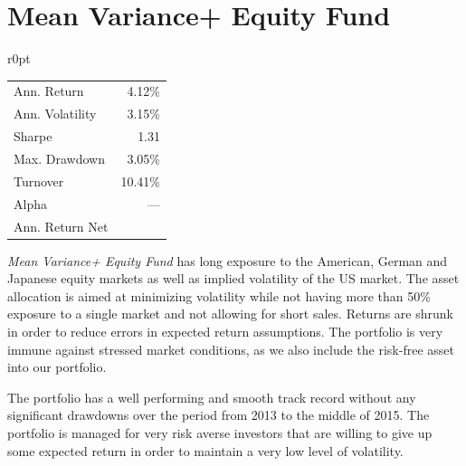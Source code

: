 \documentclass[11pt, parskip=full, DIV=14]{scrreprt}
\let\oldcenter\center
\let\oldendcenter\endcenter
\renewenvironment{center}{\setlength\topsep{6pt}\oldcenter}{\oldendcenter}
\begin{document}
\newpage\section*{Mean Variance+ Equity Fund}
\begin{mywraptable}{r}{0pt}
  \begin{tabular}{lr}
  \toprule
  Ann. Return & 4.12\%\\
  Ann. Volatility & 3.15\%\\
  Sharpe & 1.31\\
  Max. Drawdown& 3.05\%\\
  Turnover & 10.41\%\\
  Alpha & ---\\
  Ann. Return Net & \\
  \bottomrule
\end{tabular}
\end{mywraptable}
\textit{Mean Variance+ Equity Fund} has long exposure to the American, German and Japanese equity markets as well as implied volatility of the US market.
The asset allocation is aimed at minimizing volatility while not having more than 50\% exposure to a single market and not allowing for short sales.
Returns are shrunk in order to reduce errors in expected return assumptions.
The portfolio is very immune against stressed market conditions, as we also include the risk-free asset into our portfolio.%
%
\begin{center}
\end{center}
%
The portfolio has a well performing and smooth track record without any significant drawdowns over the period from 2013 to the middle of 2015.
The portfolio is managed for very risk averse investors that are willing to give up some expected return in order to maintain a very low level of volatility.
\end{document}
